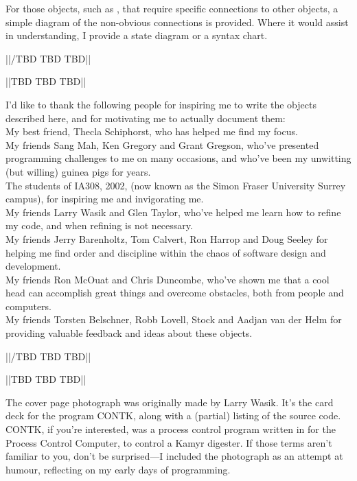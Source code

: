 For those objects, such as , that require specific connections to other objects, a simple diagram of the non-obvious
connections is provided.
Where it would assist in understanding, I provide a state diagram or a syntax chart.



||/TBD TBD TBD||





\newpage
||TBD TBD TBD||

I'd like to thank the following people for inspiring me to write the objects described here, and for motivating me to actually
document them:\\
My best friend, Thecla Schiphorst, who has helped me find my focus.\\
My friends Sang Mah, Ken Gregory and Grant Gregson, who've presented \MaxName{} programming challenges to me on many occasions, and
who've been my unwitting (but willing) guinea pigs for years.\\
The students of IA308, 2002,  (now known as the Simon Fraser University Surrey campus),
for inspiring me and invigorating me.\\
My friends Larry Wasik and Glen Taylor, who've helped me learn how to refine my code, and when refining is not necessary.\\
My friends Jerry Barenholtz, Tom Calvert, Ron Harrop and Doug Seeley for helping me find order and discipline within the chaos
of software design and development.\\
My friends Ron McOuat and Chris Duncombe, who've shown me that a cool head can accomplish great things and overcome obstacles,
both from people and computers.\\
My friends Torsten Belschner, Robb Lovell, Stock and Aadjan van der Helm for providing valuable feedback and ideas about
these objects.

||/TBD TBD TBD||

\vspace{1ex}
||TBD TBD TBD||

The cover page photograph was originally made by Larry Wasik.
It's the card deck for the program CONTK, along with a (partial) listing of the source code.
CONTK, if you're interested, was a process control program written in  for the  Process Control Computer,
to control a Kamyr digester.
If those terms aren't familiar to you, don't be surprised---I included the photograph as an attempt at humour, reflecting on
my early days of programming.

